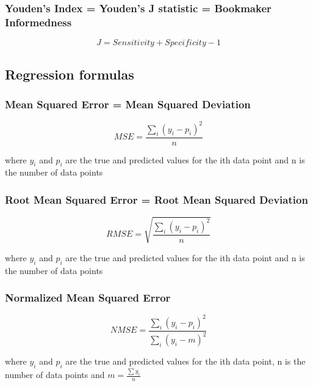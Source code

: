 \documentclass[a4paper,11pt]{article}
\begin{document}
\subsubsection{Youden's Index = Youden's J statistic = Bookmaker Informedness}\label{formula:youden}

\begin{equation}
    J = Sensitivity + Specificity - 1
\end{equation}

\subsection{Regression formulas}

\subsubsection{Mean Squared Error = Mean Squared Deviation}\label{formula:mse}

\begin{equation}
    MSE = \frac{\sum_i (y_i - p_i)^2}{n}
\end{equation}

where $y_i$ and $p_i$ are the true and predicted values for the ith data point and n is the number of data points

\subsubsection{Root Mean Squared Error = Root Mean Squared Deviation}\label{formula:rmse}

\begin{equation}
    RMSE = \sqrt{\frac{\sum_i (y_i - p_i)^2}{n}}
\end{equation}

where $y_i$ and $p_i$ are the true and predicted values for the ith data point and n is the number of data points

\subsubsection{Normalized Mean Squared Error}\label{formula:nmse}

\begin{equation}
    NMSE = \frac{\sum_i (y_i - p_i)^2}{\sum_i (y_i - m)^2}
\end{equation}

where $y_i$ and $p_i$ are the true and predicted values for the ith data point, n is the number of data points and $m = \frac{\sum y_i}{n}$
\end{document}
